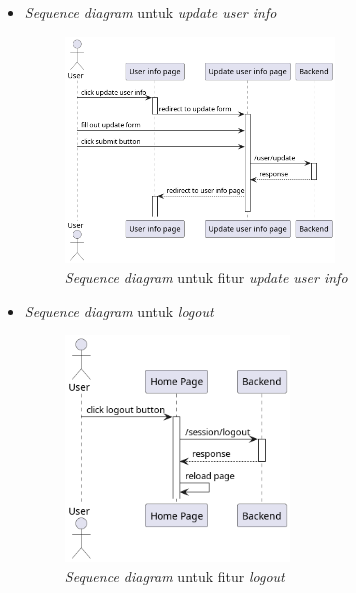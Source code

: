 \documentclass[a4paper]{article}
\begin{document}
\begin{enumerate}
\begin{enumerate}
\begin{itemize}
            \newpage
            \item \textit{Sequence diagram} untuk \textit{update user info}
            \begin{figure}[h]
                \centering
                \includegraphics*[height=6cm]{diagram/sequence diagram/FE/5. update user info/update user info.png}
                \caption{\textit{Sequence diagram} untuk fitur \textit{update user info}}
            \end{figure}

            \item \textit{Sequence diagram} untuk \textit{logout}
            \begin{figure}[h]
                \centering
                \includegraphics*[height=6cm]{diagram/sequence diagram/FE/6. logout/logout.png}
                \caption{\textit{Sequence diagram} untuk fitur \textit{logout}}
            \end{figure}


\end{itemize}
\end{enumerate}
\end{enumerate}
\end{document}
